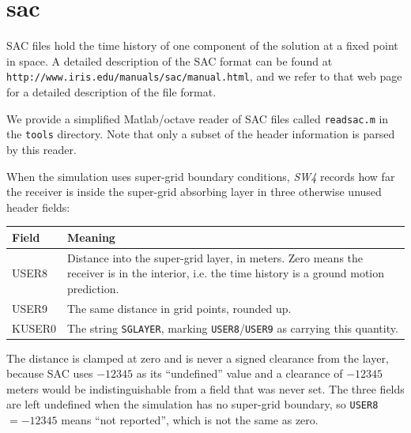 \documentclass[11pt]{report}
\begin{document}
{\begin{verbatim}
\end{verbatim}

\section{sac}\label{sec:sac-format}

SAC files hold the time history of one component of the solution at a fixed point in space.  A
detailed description of the SAC format can be found at {\tt
		http://www.iris.edu/manuals/sac/manual.html}, and we refer to that web page for a detailed
description of the file format.

We provide a simplified Matlab/octave reader of SAC files called {\tt readsac.m} in the {\tt tools}
directory. Note that only a subset of the header information is parsed by this reader.

When the simulation uses super-grid boundary conditions, \emph{SW4} records how far the receiver is
inside the super-grid absorbing layer in three otherwise unused header fields:

\begin{center}
	\begin{tabular}{|l|p{10cm}|} \hline
		\bf{Field} & \bf{Meaning}                                                        \\ \hline \hline
		USER8      & Distance into the super-grid layer, in meters. Zero means the receiver
		is in the interior, i.e. the time history is a ground motion prediction.
		\\ \hline
		USER9      & The same distance in grid points, rounded up.                         \\ \hline
		KUSER0     & The string {\tt SGLAYER}, marking {\tt USER8}/{\tt USER9} as carrying
		this quantity.
		\\ \hline
	\end{tabular}
\end{center}

The distance is clamped at zero and is never a signed clearance from the layer, because SAC uses
$-12345$ as its ``undefined'' value and a clearance of $-12345$ meters would be indistinguishable
from a field that was never set. The three fields are left undefined when the simulation has no
super-grid boundary, so {\tt USER8} $=-12345$ means ``not reported'', which is not the same as zero.

}
\end{document}
